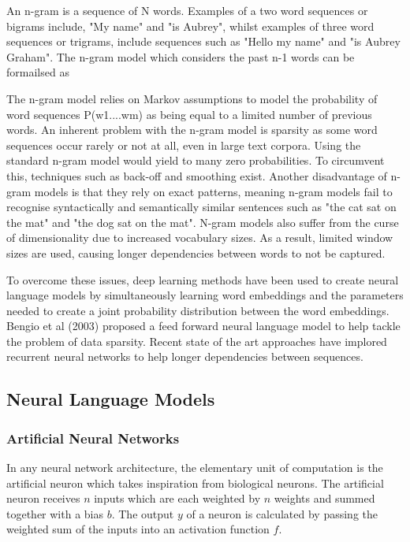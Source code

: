\noindent
\newline
An n-gram is a sequence of N words. Examples of a two word sequences or bigrams include, "My name" and "is Aubrey", whilst examples of three word sequences or trigrams, include sequences such as "Hello my name" and "is Aubrey Graham". The n-gram model which considers the past n-1 words can be formailsed as 

\noindent
\newline
The n-gram model relies on Markov assumptions to model the probability of word sequences P(w1....wm) as being equal to a limited number of previous words. An inherent problem with the n-gram model is sparsity as some word sequences occur rarely or not at all, even in large text corpora. Using the standard n-gram model would yield to many zero probabilities. To circumvent this, techniques such as back-off and smoothing exist. Another disadvantage of n-gram models is that they rely on exact patterns, meaning n-gram models fail to recognise syntactically and semantically similar sentences such as "the cat sat on the mat" and "the dog sat on the mat". N-gram models also suffer from the curse of dimensionality due to increased vocabulary sizes. As a result, limited window sizes are used, causing longer dependencies between words to not be captured.

\noindent
\newline
To overcome these issues, deep learning methods have been used to create neural language models by simultaneously learning word embeddings and the parameters needed to create a joint probability distribution between the word embeddings. Bengio et al (2003) proposed a feed forward neural language model to help tackle the problem of data sparsity. Recent state of the art approaches have implored recurrent neural networks to help longer dependencies between sequences.
 

\subsection{Neural Language Models}
\subsubsection{Artificial Neural Networks}
In any neural network architecture, the elementary unit of computation is the artificial neuron which takes inspiration from biological neurons. The artificial neuron receives \(n\) inputs which are each weighted by \(n\) weights and summed together with a bias \(b\). The output \(y\) of a neuron is calculated by passing the weighted sum of the inputs into an activation function \(f\). 

